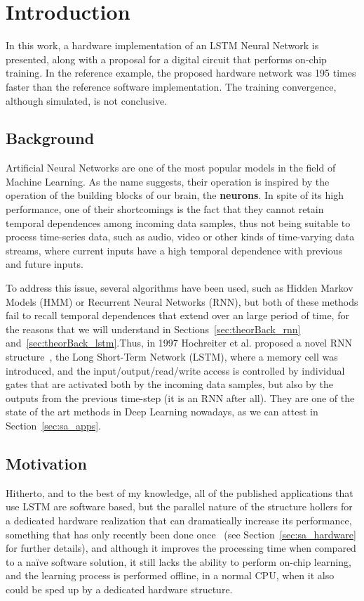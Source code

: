 \chapter{Introduction}\label{chap:intro}

In this work, a hardware implementation of an LSTM Neural Network is presented, along with a proposal for a digital circuit that performs on-chip training. In the reference example, the proposed hardware network was 195 times
faster than the reference software implementation. The training convergence, although simulated, is not conclusive.

\section{Background}\label{sec:intro_back}
Artificial Neural Networks are one of the most popular models in the field of Machine Learning. As the name suggests, their operation is inspired by the operation of the building blocks of our brain, the \textbf{neurons}. In spite of its high performance, one of their shortcomings is the fact that they cannot retain temporal dependences among incoming data samples, thus not being suitable to process time-series data, such as audio, video or other kinds of time-varying data streams, where current inputs have a high temporal dependence with previous and future inputs. 

To address this issue, several algorithms have been used, such as Hidden Markov Models (HMM) or Recurrent Neural Networks (RNN), but both of these methods fail to recall temporal dependences that extend over an large period of time, for the reasons that we will understand in Sections~\ref{sec:theorBack_rnn} and~\ref{sec:theorBack_lstm}.Thus, in 1997 Hochreiter et al. proposed a novel RNN structure~\cite{Hoch97}, the Long Short-Term Network (LSTM), where a memory cell was introduced, and the input/output/read/write access is controlled by individual gates that are activated both by the incoming data samples, but also by the outputs from the previous time-step (it is an RNN after all). They are one of the state of the art methods in Deep Learning nowadays, as we can attest in Section~\ref{sec:sa_apps}.

\section{Motivation}\label{sec:intro_mot}
Hitherto, and to the best of my knowledge, all of the published applications that use LSTM are software based, but the parallel nature of the structure hollers for a dedicated hardware realization that can dramatically increase its performance, something that  has only recently been done once~\cite{Chang15} (see Section~\ref{sec:sa_hardware} for further details), and although it improves the processing time when compared to a naïve software solution, it still lacks the ability to perform on-chip learning, and the learning process is performed offline, in a normal CPU, when it also could be sped up by a dedicated hardware structure.

